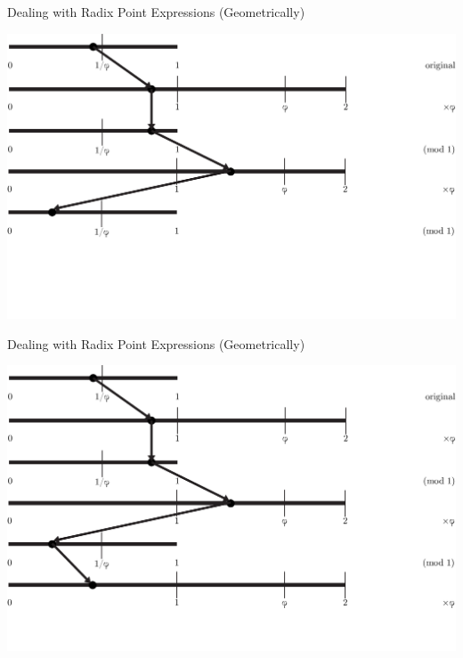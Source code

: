 \documentclass{beamer}
\begin{document}
\begin{frame}{Dealing with Radix Point Expressions (Geometrically)}
  \addtocounter{framenumber}{-1}
  \begin{example}
    \includegraphics[width=\textwidth,height=0.75\textheight]{images/Phinary/5}
  \end{example}
\end{frame}

\begin{frame}{Dealing with Radix Point Expressions (Geometrically)}
  \addtocounter{framenumber}{-1}
  \begin{example}
    \includegraphics[width=\textwidth,height=0.75\textheight]{images/Phinary/6}
  \end{example}
\end{frame}
\end{document}
